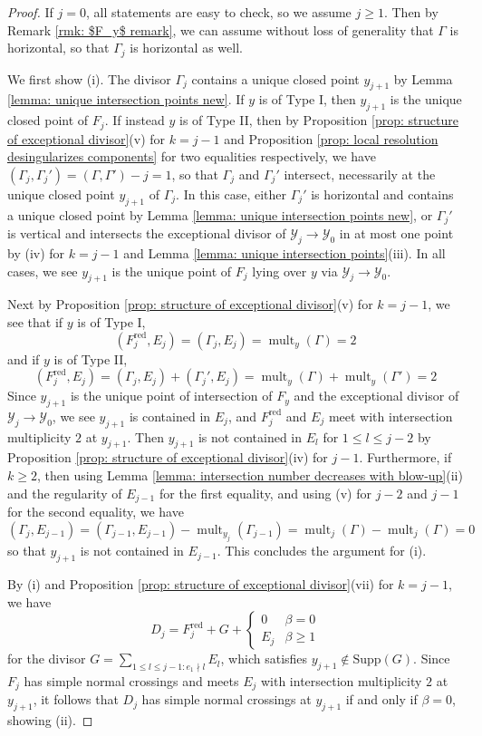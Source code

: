 \documentclass[12pt]{amsart}
\numberwithin{equation}{section}
\theoremstyle{definition}
\newcommand{\Y}{\mathcal{Y}}
\newcommand{\tx}[1]{\text{#1}}
\DeclareMathOperator{\red}{red}
\DeclareMathOperator{\mult}{mult}
\begin{document}
\begin{proof}
    If $j=0$, all statements are easy to check, so we assume $j\geq 1$. Then by Remark \ref{rmk: $F_y$ remark}, we can assume without loss of generality that $\Gamma$ is horizontal, so that $\Gamma_j$ is horizontal as well.

    We first show (i). The divisor $\Gamma_j$ contains a unique closed point $y_{j+1}$ by Lemma \ref{lemma: unique intersection points new}. If $y$ is of Type I, then $y_{j+1}$ is the unique closed point of $F_j$. If instead $y$ is of Type II, then by Proposition \ref{prop: structure of exceptional divisor}(v) for $k=j-1$ and Proposition \ref{prop: local resolution desingularizes components} for two equalities respectively, we have $(\Gamma_j,\Gamma_j')=(\Gamma,\Gamma')-j=1$, so that $\Gamma_j$ and $\Gamma_j'$ intersect, necessarily at the unique closed point $y_{j+1}$ of $\Gamma_j$. In this case, either $\Gamma_j'$ is horizontal and contains a unique closed point by Lemma \ref{lemma: unique intersection points new}, or $\Gamma_j'$ is vertical and intersects the exceptional divisor of $\Y_j\to\Y_0$ in at most one point by (iv) for $k=j-1$ and Lemma \ref{lemma: unique intersection points}(iii). In all cases, we see $y_{j+1}$ is the unique point of $F_j$ lying over $y$ via $\Y_j\to\Y_0$.
    
    Next by Proposition \ref{prop: structure of exceptional divisor}(v) for $k=j-1$, we see that if $y$ is of Type I, \[(F_j^{\red},E_j)=(\Gamma_j,E_j)=\mult_y(\Gamma)=2\] and if $y$ is of Type II, \[(F_j^{\red},E_j)=(\Gamma_j,E_j)+(\Gamma_j',E_j)=\mult_y(\Gamma)+\mult_y(\Gamma')=2\]
    Since $y_{j+1}$ is the unique point of intersection of $F_y$ and the exceptional divisor of $\Y_j\to\Y_0$, we see $y_{j+1}$ is contained in $E_j$, and $F_j^{\red}$ and $E_j$ meet with intersection multiplicity $2$ at $y_{j+1}$. Then $y_{j+1}$ is not contained in $E_l$ for $1\leq l\leq j-2$ by Proposition \ref{prop: structure of exceptional divisor}(iv) for $j-1$. Furthermore, if $k\geq 2$, then using Lemma \ref{lemma: intersection number decreases with blow-up}(ii) and the regularity of $E_{j-1}$ for the first equality, and using (v) for $j-2$ and $j-1$ for the second equality, we have \[(\Gamma_j, E_{j-1})=(\Gamma_{j-1},E_{j-1})-\mult_{y_j}(\Gamma_{j-1})=\mult_j(\Gamma)-\mult_j(\Gamma)=0\] so that $y_{j+1}$ is not contained in $E_{j-1}$. This concludes the argument for (i).
    
    By (i) and Proposition \ref{prop: structure of exceptional divisor}(vii) for $k=j-1$, we have \[D_j=F_j^{\red}+G+\begin{cases}0&\beta=0\\ E_j&\beta\geq 1\end{cases}\] for the divisor $G=\sum_{1\leq l\leq j-1:e_1\nmid l}E_l$, which satisfies $y_{j+1}\notin\tx{Supp}(G)$. Since $F_j$ has simple normal crossings and meets $E_j$ with intersection multiplicity $2$ at $y_{j+1}$, it follows that $D_j$ has simple normal crossings at $y_{j+1}$ if and only if $\beta=0$, showing (ii).
    

\end{proof}
\end{document}

